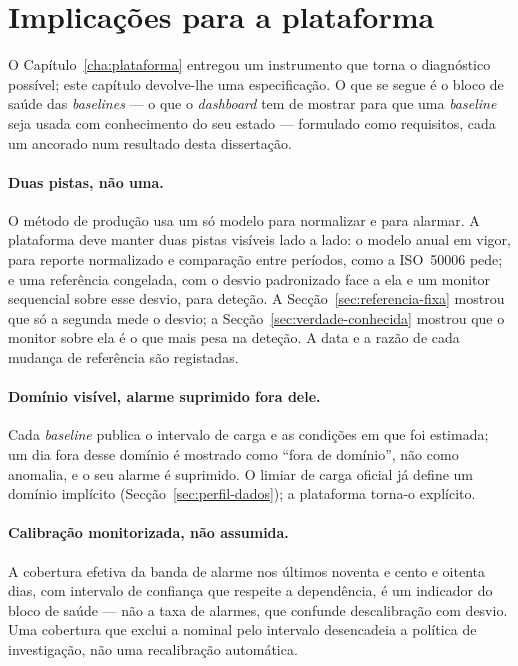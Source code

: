 \section{Implicações para a plataforma}
\label{sec:implicacoes-plataforma}

O Capítulo~\ref{cha:plataforma} entregou um instrumento que torna o
diagnóstico possível; este capítulo devolve-lhe uma especificação. O que se
segue é o bloco de saúde das \emph{baselines} --- o que o \emph{dashboard}
tem de mostrar para que uma \emph{baseline} seja usada com conhecimento do
seu estado --- formulado como requisitos, cada um ancorado num resultado
desta dissertação.

\paragraph{Duas pistas, não uma.} O método de produção usa um só modelo para
normalizar e para alarmar. A plataforma deve manter duas pistas visíveis
lado a lado: o modelo anual em vigor, para reporte normalizado e comparação
entre períodos, como a ISO~50006 pede; e uma referência congelada, com o
desvio padronizado face a ela e um monitor sequencial sobre esse desvio,
para deteção. A Secção~\ref{sec:referencia-fixa} mostrou que só a segunda
mede o desvio; a Secção~\ref{sec:verdade-conhecida} mostrou que o monitor
sobre ela é o que mais pesa na deteção. A data e a razão de cada mudança de
referência são registadas.

\paragraph{Domínio visível, alarme suprimido fora dele.} Cada
\emph{baseline} publica o intervalo de carga e as condições em que foi
estimada; um dia fora desse domínio é mostrado como ``fora de domínio'', não
como anomalia, e o seu alarme é suprimido. O limiar de carga oficial já
define um domínio implícito (Secção~\ref{sec:perfil-dados}); a plataforma
torna-o explícito.

\paragraph{Calibração monitorizada, não assumida.} A cobertura efetiva da
banda de alarme nos últimos noventa e cento e oitenta dias, com intervalo de
confiança que respeite a dependência, é um indicador do bloco de saúde ---
não a taxa de alarmes, que confunde descalibração com desvio. Uma cobertura
que exclui a nominal pelo intervalo desencadeia a política de investigação,
não uma recalibração automática.

